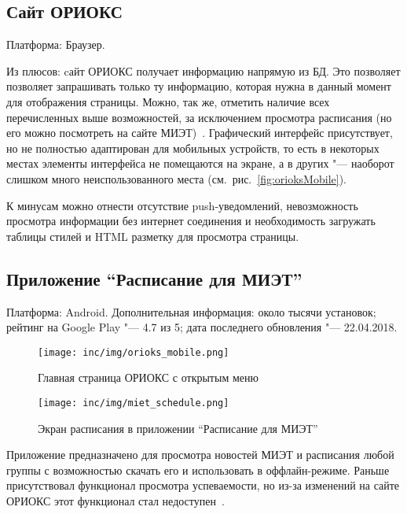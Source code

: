 \subsection{Сайт ОРИОКС}
\label{subsec:orioks}

Платформа: Браузер.

Из плюсов: cайт ОРИОКС получает информацию напрямую из БД.
Это позволяет позволяет запрашивать только ту информацию, которая нужна в данный момент для отображения страницы.
Можно, так же, отметить наличие всех перечисленных выше возможностей, за исключением просмотра расписания (но его можно посмотреть на сайте МИЭТ)~\cite{orioks}.
Графический интерфейс присутствует, но не полностью адаптирован для мобильных устройств, то есть в некоторых местах элементы интерфейса не помещаются на экране, а в других "--- наоборот слишком много неиспользованного места (см.~рис.~\ref{fig:orioksMobile}).

К минусам можно отнести отсутствие push-уведомлений, невозможность просмотра информации без интернет соединения и необходимость загружать таблицы стилей и HTML разметку для просмотра страницы.

\subsection{Приложение ``Расписание для МИЭТ''}
\label{subsec:appMietSchedule}
Платформа: Android.
Дополнительная информация: около тысячи установок;
рейтинг на Google Play "--- 4.7 из 5;
дата последнего обновления "--- 22.04.2018.

\begin{figure}[ht]
    \texttt{[image: inc/img/orioks\_mobile.png]}
    \caption{Главная страница ОРИОКС с открытым меню}
    \label{fig:orioksMobile}
  \endminipage\hfill
    \texttt{[image: inc/img/miet\_schedule.png]}
    \caption{Экран расписания в приложении ``Расписание для МИЭТ''}
    \label{fig:mietSchedule}
  \endminipage
\end{figure}

Приложение предназначено для просмотра новостей МИЭТ и расписания любой группы с возможностью скачать его и использовать в оффлайн-режиме.
Раньше присутствовал функционал просмотра успеваемости, но из-за изменений на сайте ОРИОКС этот функционал стал недоступен~\cite{market:mietSchedule}.

